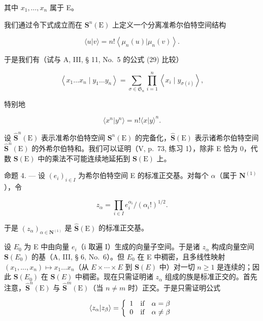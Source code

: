 其中 \(x_{1},\ldots ,x_{n}\) 属于 E。

我们通过令下式成立而在 \(\mathbf{S}^{n}(\mathrm{E})\) 上定义一个分离准希尔伯特空间结构

\[
\langle u | v \rangle = n! \left\langle \mu_ {n} (u) | \mu_ {n} (v) \right\rangle .\tag{14}
\]

于是我们有（试与 A, III, § 11, No.~5 的公式 (29) 比较）

\[
\left\langle x _ {1} \dots x _ {n} \mid y _ {1} \dots y _ {n} \right\rangle = \sum_ {\sigma \in \mathfrak {S} _ {n}} \prod_ {i = 1} ^ {n} \left\langle x _ {i} \mid y _ {\sigma (i)} \right\rangle ,\tag{15}
\]

特别地

\[
\langle x ^ {n} | y ^ {n} \rangle = n! \langle x | y \rangle^ {n}.\tag{16}
\]

设 \(\hat{\mathbf{S}}^n (\mathrm{E})\) 表示准希尔伯特空间 \(\mathbf{S}^n (\mathrm{E})\) 的完备化，\(\hat{\mathbf{S}} (\mathrm{E})\) 表示诸希尔伯特空间 \(\hat{\mathbf{S}}^n (\mathrm{E})\) 的外希尔伯特和。我们可以证明（V, p.~73, 练习 1），除非 E 恰为 0，代数 \(\mathbf{S}(\mathrm{E})\) 中的乘法不可能连续地延拓到 \(\mathbf{S}(\mathrm{E})\) 上。

命题 4. --- 设 \((e_{i})_{i\in I}\) 为希尔伯特空间 E 的标准正交基。对每个 \(\alpha\)（属于 \(\mathbf{N}^{(1)}\)），令

\[
z _ {\alpha} = \prod_ {i \in I} e _ {i} ^ {\alpha_ {i}} / (\alpha_ {i}!) ^ {1 / 2}.\tag{17}
\]

于是 \((z_{\alpha})_{\alpha \in \mathbf{N}^{(1)}}\) 是 \(\hat{\mathbf{S}} (\mathrm{E})\) 的标准正交基。

设 \(E_{0}\) 为 E 中由向量 \(e_{i}\)（i 取遍 I）生成的向量子空间。于是诸 \(z_{\alpha}\) 构成向量空间 \(\mathbf{S}(E_{0})\) 的基（A, III, § 6, No.~6）。但 \(E_{0}\) 在 E 中稠密，且多线性映射 \((x_{1},...,x_{n})\mapsto x_{1}\ldots x_{n}\)（从 \(E\times\cdots\times E\) 到 \(\mathbf{S}(E)\) 中）对一切 \(n\geqslant1\) 是连续的；因此 \(\mathbf{S}(E_{0})\) 在 \(\mathbf{S}(E)\) 中稠密。现在只需证明诸 \(z_{\alpha}\) 组成的族是标准正交的。首先注意，\(\hat{\mathbf{S}}^{n}(\mathrm{E})\) 与 \(\hat{\mathbf{S}}^{m}(\mathrm{E})\)（当 \(n \neq m\) 时）正交。于是只需证明公式

\[
\langle z _ {\alpha} | z _ {\beta} \rangle = \left\{ \begin{array}{l l} 1 & \text {if} \quad \alpha = \beta \\ 0 & \text {if} \quad \alpha \neq \beta \end{array} \right.
\]

